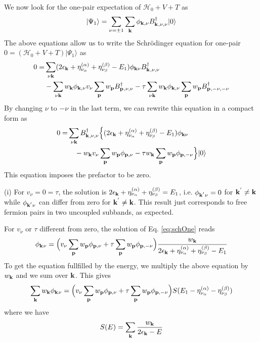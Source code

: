 \documentclass[11pt]{article} %
\begin{document}
We now look for the one-pair expectation of $\mathcal{H}_0+V+T$ as 
\begin{equation}\label{eq:Psi1}
|\Psi_1\rangle=\sum_{\nu=\pm1}\sum_{\mathbf{k}}\phi_{\mathbf{k},\nu}B^{\dagger}_{\mathbf{k}^{ },\nu,\nu}|0\rangle
\end{equation}
The above equations allow us to write the Schr\"odinger equation for one-pair $0=(\mathcal{H}_0+V+T)|\Psi_1\rangle$ as 
\begin{equation}
\begin{split}
0=&\sum_{\nu\mathbf{k}}(2\epsilon_{\mathbf{k}}+\eta_{\nu_{\alpha}}^{(\alpha)}+\eta_{\nu_{\beta}}^{(\beta)}-E_1)\phi_{\mathbf{k}\nu}B^{\dagger}_{\mathbf{k}^{ },\nu,\nu}\\
&-\sum_{\nu\mathbf{k}}w_{\mathbf{k}}\phi_{\mathbf{k},\nu}v_{\nu}\sum_{\mathbf{p}}w_{\mathbf{p}}B^{\dagger}_{\mathbf{p}^{ },\nu,\nu}
 -\tau\sum_{\nu\mathbf{k}}w_{\mathbf{k}}\phi_{\mathbf{k},\nu}\sum_{\mathbf{p}}w_{\mathbf{p}}B^{\dagger}_{\mathbf{p}^{ },-\nu,-\nu}
\end{split}
\end{equation}
By changing $\nu$ to $-\nu$ in the last term, we can rewrite this equation in a compact form as 
\begin{equation}\label{eq:schOne}
\begin{split}
0=&\sum_{\nu\mathbf{k}}B^{\dagger}_{\mathbf{k}^{ },\nu,\nu}\Big\{(2\epsilon_{\mathbf{k}}+\eta_{\nu_{\alpha}}^{(\alpha)}+\eta_{\nu_{\beta}}^{(\beta)}-E_1)\phi_{\mathbf{k}\nu}\\
&\quad-w_{\mathbf{k}}v_{\nu}\sum_{\mathbf{p}}w_{\mathbf{p}}\phi_{\mathbf{p},\nu}-\tau{}w_{\mathbf{k}}\sum_{\mathbf{p}}w_{\mathbf{p}}\phi_{\mathbf{p},-\nu}\Big\}|0\rangle
\end{split}
\end{equation}
This equation imposes the prefactor to be zero. 

(i) For $v_{\nu}=0=\tau$, the solution is $2\epsilon_{\mathbf{k}}+\eta_{\nu_{\alpha}}^{(\alpha)}+\eta_{\nu_{\beta}}^{(\beta)}=E_1$, i.e. $\phi_{\mathbf{k}^{'}\nu}=0$ for $\mathbf{k}^{'}\neq\mathbf{k}$ while $\phi_{\mathbf{k}^{'}\nu}$ can differ from zero for  $\mathbf{k}^{'}\neq\mathbf{k}$. This result just corresponds to free fermion pairs in two uncoupled subbands, as expected. 

For $v_{\nu}$ or $\tau$ different from zero, the solution of Eq. \ref{eq:schOne} reads
\begin{equation}\label{eq:phi}
\phi_{\mathbf{k}^{}\nu}=\Big(v_{\nu}\sum_{\mathbf{p}}w_{\mathbf{p}}\phi_{\mathbf{p},\nu}+\tau{}\sum_{\mathbf{p}}w_{\mathbf{p}}\phi_{\mathbf{p},-\nu}\Big)
\frac{w_{\mathbf{k}}}{2\epsilon_{\mathbf{k}}+\eta_{\nu_{\alpha}}^{(\alpha)}+\eta_{\nu_{\beta}}^{(\beta)}-E_1}
\end{equation}
To get the equation fullfilled by the energy, we multiply the above equation by $w_{\mathbf{k}}$ and we sum over $\mathbf{k}$.  This gives 
\begin{equation}\label{eq:phiS}
\sum_{\mathbf{k}}w_{\mathbf{k}}\phi_{\mathbf{k}^{}\nu}=\Big(v_{\nu}\sum_{\mathbf{p}}w_{\mathbf{p}}\phi_{\mathbf{p},\nu}+\tau{}\sum_{\mathbf{p}}w_{\mathbf{p}}\phi_{\mathbf{p},-\nu}\Big)
S(E_1-\eta_{\nu_{\alpha}}^{(\alpha)}-\eta_{\nu_{\beta}}^{(\beta)})
\end{equation}
where we have 
\begin{equation}\label{eq:Sdef}
S(E)=\sum_{\mathbf{k}}\frac{w_{\mathbf{k}}}{2\epsilon_{\mathbf{k}}-E}
\end{equation}
\end{document}
